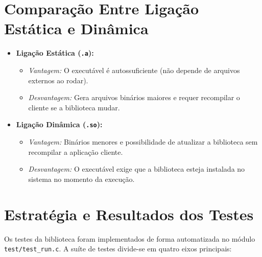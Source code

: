 \documentclass[12pt, a4paper]{article}
\begin{document}
\section{Comparação Entre Ligação Estática e Dinâmica}
\begin{itemize}
    \item \textbf{Ligação Estática (\texttt{.a}):} 
    \begin{itemize}
        \item \emph{Vantagem:} O executável é autossuficiente (não depende de arquivos externos ao rodar).
        \item \emph{Desvantagem:} Gera arquivos binários maiores e requer recompilar o cliente se a biblioteca mudar.
    \end{itemize}
    \item \textbf{Ligação Dinâmica (\texttt{.so}):} 
    \begin{itemize}
        \item \emph{Vantagem:} Binários menores e possibilidade de atualizar a biblioteca sem recompilar a aplicação cliente.
        \item \emph{Desvantagem:} O executável exige que a biblioteca esteja instalada no sistema no momento da execução.
    \end{itemize}
\end{itemize}

\section{Estratégia e Resultados dos Testes}
Os testes da biblioteca foram implementados de forma automatizada no módulo \texttt{test/test\_run.c}. A suíte de testes divide-se em quatro eixos principais:
\end{document}
